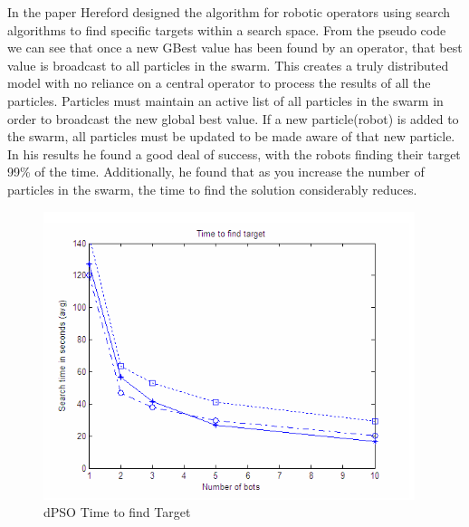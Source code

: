 \documentclass[oneside,12pt]{book}
\begin{document}
In the paper Hereford designed the algorithm for robotic operators using search algorithms to find specific targets within a search space. From the pseudo code we can see that once a new GBest value has been found by an operator, that best value is broadcast to all particles in the swarm. 
This creates a truly distributed model with no reliance on a central operator to process the results of all the particles. Particles must maintain an active list of all particles in the swarm in order to broadcast the new global best value. If a new particle(robot) is added to the swarm, all particles must be updated to be made aware of that new particle. 
In his results he found a good deal of success, with the robots finding their target 99\% of the time. Additionally, he found that as you increase the number of particles in the swarm, the time to find the solution considerably reduces. 
\begin{figure}[H]
    \centering
    \includegraphics[scale=0.9]{Images/HerefordResults.png}
    \caption{dPSO Time to find Target \protect\cite{hereford_2006} }
    \label{fig:dPSO Time to find Target}
\end{figure}
\end{document}
